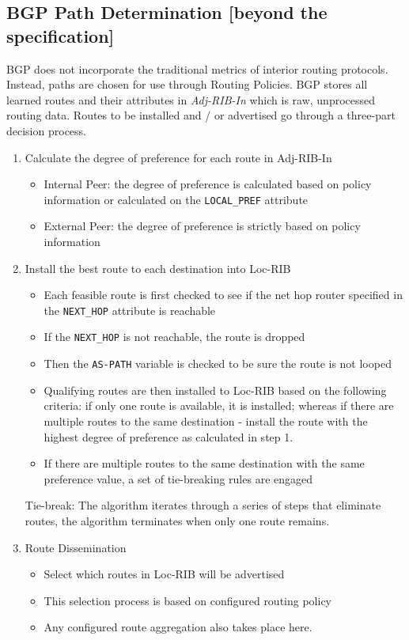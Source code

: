 \subsection{BGP Path Determination [beyond the specification]}
BGP does not incorporate the traditional metrics of interior routing protocols. Instead, paths are chosen for use through Routing Policies. BGP stores all learned routes and their attributes in \textit{Adj-RIB-In} which is raw, unprocessed routing data. Routes to be installed and / or advertised go through a three-part decision process. 
\begin{enumerate}
    \item Calculate the degree of preference for each route in Adj-RIB-In
    \begin{itemize}
        \item Internal Peer: the degree of preference is calculated based on policy information or calculated on the \verb|LOCAL_PREF| attribute
        \item External Peer: the degree of preference is strictly based on policy information
    \end{itemize}
    \item Install the best route to each destination into Loc-RIB
    \begin{itemize}
        \item Each feasible route is first checked to see if the net hop router specified in the \verb|NEXT_HOP| attribute is reachable
        \item If the \verb|NEXT_HOP| is not reachable, the route is dropped
        \item Then the \verb|AS-PATH| variable is checked to be sure the route is not looped
        \item Qualifying routes are then installed to Loc-RIB based on the following criteria: if only one route is available, it is installed; whereas if there are multiple routes to the same destination - install the route with the highest degree of preference as calculated in step 1.
        \item If there are multiple routes to the same destination with the same preference value, a set of tie-breaking rules are engaged
    \end{itemize}
    Tie-break: The algorithm iterates through a series of steps that eliminate routes, the algorithm terminates when only one route remains.
    \item Route Dissemination
    \begin{itemize}
        \item Select which routes in Loc-RIB will be advertised
        \item This selection process is based on configured routing policy
        \item Any configured route aggregation also takes place here. 
    \end{itemize}
\end{enumerate}

